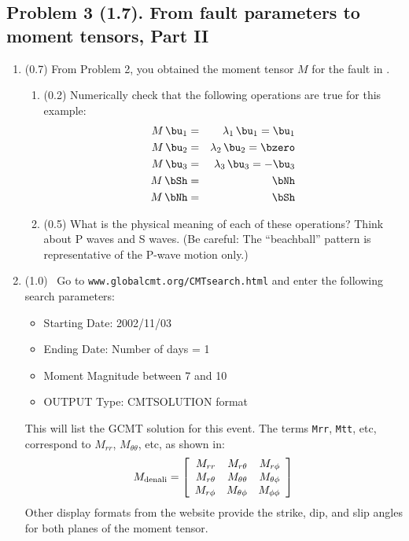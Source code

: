 \documentclass[11pt,titlepage,fleqn]{article}
\newcommand{\Mmat}{M}
\begin{document}

\pagebreak
\subsection*{Problem 3 (1.7). From fault parameters to moment tensors, Part II}

\begin{enumerate}

\item (0.7) From Problem 2, you obtained the moment tensor $\Mmat$ for the fault in .

\begin{enumerate}
\item (0.2) Numerically check that the following operations are true for this example:
%
\begin{eqnarray}
\Mmat \, \bu_1 &=& \lambda_1 \, \bu_1 = \bu_1
\\
\Mmat \, \bu_2 &=& \lambda_2 \, \bu_2 = \bzero
\\
\Mmat \, \bu_3 &=& \lambda_3 \, \bu_3 = -\bu_3
\\
\Mmat \, \bSh &=& \bNh
\\
\Mmat \, \bNh &=& \bSh
\end{eqnarray}

\item (0.5) What is the physical meaning of each of these operations? Think about P waves and S waves. (Be careful: The ``beachball'' pattern is representative of the P-wave motion only.)

\end{enumerate}


\item (1.0) \ptag\ Go to \verb+www.globalcmt.org/CMTsearch.html+ and enter the following search parameters:

\begin{itemize}
\item Starting Date: 2002/11/03
\item Ending Date: Number of days = 1
\item Moment Magnitude between 7 and 10
\item OUTPUT Type: CMTSOLUTION format
\end{itemize}
%
This will list the GCMT solution for this event. The terms \verb+Mrr+, \verb+Mtt+, etc, correspond to $M_{rr}$, $M_{\theta\theta}$, etc, as shown in:
%
\begin{equation}
\Mmat_{\rm denali} =
\left[ \begin{array}{rrr}
   M_{rr}     &  M_{r\theta}     & M_{r\phi}  \\
   M_{r\theta}  &  M_{\theta\theta} &  M_{\theta\phi}  \\
   M_{r\phi}   &  M_{\theta\phi}   &  M_{\phi\phi}
\end{array} \right]
\end{equation}
%
Other display formats from the website provide the strike, dip, and slip angles for both planes of the moment tensor.


\end{enumerate}
\end{document}
